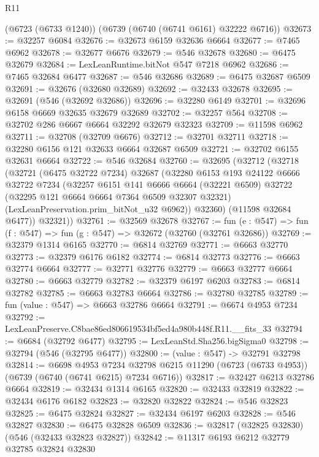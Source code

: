 \begin{lexlean}{R11}
\begin{coremodule}
    (@6723 (@6733 @1240))
    (@6739 (@6740 (@6741 @6161) @32222 @6716))
@32673 := @32257 @6084
@32676 := @32673 @6159 @32636 @6664
@32677 := @7465 @6962
@32678 := @32677 @6676
@32679 := @546 @32678
@32680 := @6475 @32679
@32684 := LexLeanRuntime.bitNot @547 @7218 @6962
@32686 := @7465 @32684 @6477
@32687 := @546 @32686
@32689 := @6475 @32687 @6509
@32691 := @32676 (@32680 @32689)
@32692 := @32433 @32678
@32695 := @32691 (@546 (@32692 @32686))
@32696 := @32280 @6149
@32701 := @32696 @6158 @6669 @32635 @32679 @32689
@32702 := @32257 @564
@32708 := @32702 @286 @6667 @6664 @32292 @32679 @32323
@32709 := @11598 @6962
@32711 := @32708 (@32709 @6676)
@32712 := @32701 @32711
@32718 := @32280 @6156 @121 @32633 @6664 @32687 @6509
@32721 := @32702 @6155 @32631 @6664
@32722 := @546 @32684
@32760 := @32695
    (@32712
      (@32718
        (@32721
          (@6475 @32722 @7234)
          @32687
          (@32280
            @6153
            @193
            @24122
            @6666
            @32722
            @7234
            (@32257
              @6151
              @141
              @6666
              @6664
              (@32221 @6509)
              @32722
              (@32295 @121 @6664 @6664 @7364 @6509 @32307 @32321)
              (LexLeanPreservation.prim_bitNot_u32 @6962))
            @32360)
          (@11598 @32684 @6477))
        @32321))
@32761 := @32569 @32678
@32767 := fun (e : @547) => fun (f : @547) => fun (g : @547) => @32672 (@32760 (@32761 @32686))
@32769 := @32379 @1314 @6165
@32770 := @6814 @32769
@32771 := @6663 @32770
@32773 := @32379 @6176 @6182
@32774 := @6814 @32773
@32776 := @6663 @32774 @6664
@32777 := @32771 @32776
@32779 := @6663 @32777 @6664
@32780 := @6663 @32779
@32782 := @32379 @6197 @6203
@32783 := @6814 @32782
@32785 := @6663 @32783 @6664
@32786 := @32780 @32785
@32789 := fun (value : @547) => @6663 @32786 @6664
@32791 := @6674 @4953 @7234
@32792 := LexLeanPreserve.C8bae86ed806619534bf5ed4a980b448f.R11.__fits_33
@32794 := @6684 (@32792 @6477)
@32795 := LexLeanStd.Sha256.bigSigma0
@32798 := @32794 (@546 (@32795 @6477))
@32800 := (value : @547) -> @32791 @32798
@32814 := @6698
    @4953
    @7234
    @32798
    @6215
    @11290
    (@6723 (@6733 @4953))
    (@6739 (@6740 (@6741 @6215) @7234 @6716))
@32817 := @32427 @6213 @32786 @6664
@32819 := @32434 @1314 @6165
@32820 := @32433 @32819
@32822 := @32434 @6176 @6182
@32823 := @32820 @32822
@32824 := @546 @32823
@32825 := @6475 @32824
@32827 := @32434 @6197 @6203
@32828 := @546 @32827
@32830 := @6475 @32828 @6509
@32836 := @32817 (@32825 @32830) (@546 (@32433 @32823 @32827))
@32842 := @11317 @6193 @6212 @32779 @32785 @32824 @32830

\end{coremodule}
\end{lexlean}
